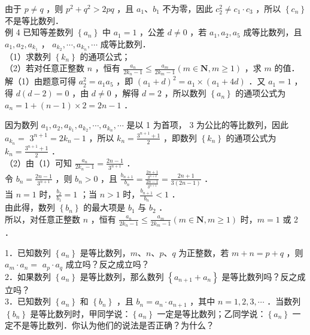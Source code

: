 \documentclass[10pt]{article}
\begin{document}
由于 \(p \neq q\) ，则 \(p^{2}+q^{2}>2 p q\) ，且 \(a_{1} 、 b_{1}\) 不为零，因此 \(c_{2}^{2} \neq c_{1} \cdot c_{3}\) ，所以 \(\left\{c_{n}\right\}\) 不是等比数列．\\
例 4 已知等差数列 \(\left\{a_{n}\right\}\) 中 \(a_{1}=1\) ，公差 \(d \neq 0\) ，若 \(a_{1}, a_{2}, a_{5}\) 成等比数列，且 \(a_{1}, a_{2}, a_{k_{1}}\) ， \(a_{k_{2}}, \cdots, a_{k_{n}}, \cdots\) 成等比数列．\\
（1）求数列 \(\left\{k_{n}\right\}\) 的通项公式；\\
（2）若对任意正整数 \(n\) ，恒有 \(\frac{a_{n}}{2 k_{n}-1} \leqslant \frac{a_{m}}{2 k_{m}-1}(m \in \mathbf{N}, m \geqslant 1)\) ，求 \(m\) 的值．\\
解（1）由题意可得 \(a_{2}^{2}=a_{1} a_{5}\) ，即 \(\left(a_{1}+d\right)^{2}=a_{1} \times\left(a_{1}+4 d\right)\) ．又 \(a_{1}=1\) ，得 \(d(d-2)=0\) ，由 \(d \neq 0\) ，解得 \(d=2\) ，所以数列 \(\left\{a_{n}\right\}\) 的通项公式为 \(a_{n}=1+(n-1) \times 2=2 n-1\) ．

因为数列 \(a_{1}, a_{2}, a_{k_{1}}, a_{k_{2}}, \cdots, a_{k_{n}}, \cdots\) 是以 1 为首项， 3 为公比的等比数列，因此 \(a_{k_{n}}=\) \(3^{n+1}=2 k_{n}-1\) ，所以 \(k_{n}=\frac{3^{n+1}+1}{2}\) ，即数列 \(\left\{k_{n}\right\}\) 的通项公式为 \(k_{n}=\frac{3^{n+1}+1}{2}\) ．\\
（2）由（1）可知 \(\frac{a_{n}}{2 k_{n}-1}=\frac{2 n-1}{3^{n+1}}\) ．\\
令 \(b_{n}=\frac{2 n-1}{3^{n+1}}\) ，则 \(b_{n}>0\) ，且 \(\frac{b_{n+1}}{b_{n}}=\frac{\frac{2 n+1}{3^{n+2}}}{\frac{2 n-1}{3^{n+1}}}=\frac{2 n+1}{3(2 n-1)}\) ．\\
当 \(n=1\) 时，\(\frac{b_{2}}{b_{1}}=1\) ；当 \(n>1\) 时，\(\frac{b_{n+1}}{b_{n}}<1\) ．\\
由此得，数列 \(\left\{b_{n}\right\}\) 的最大项是 \(b_{1}\) 与 \(b_{2}\) ．\\
所以，对任意正整数 \(n\) ，恒有 \(\frac{a_{n}}{2 k_{n}-1} \leqslant \frac{a_{m}}{2 k_{m}-1}(m \in \mathbf{N}, m \geqslant 1)\) 时，\(m=1\) 或 2 ．

1．已知数列 \(\left\{a_{n}\right\}\) 是等比数列，\(m 、 n 、 p 、 q\) 为正整数，若 \(m+n=p+q\) ，则 \(a_{m} \cdot a_{n}=\) \(a_{p} \cdot a_{q}\) 成立吗？反之成立吗？\\
2．如果数列 \(\left\{a_{n}\right\}\) 是等比数列，那么数列 \(\left\{a_{n+1}+a_{n}\right\}\) 是等比数列吗？反之成立吗？\\
3．已知数列 \(\left\{a_{n}\right\}\) 和 \(\left\{b_{n}\right\}\) ，且 \(b_{n}=a_{n} \cdot a_{n+1}\) ，其中 \(n=1,2,3, \cdots\) ．当数列 \(\left\{b_{n}\right\}\) 是等比数列时，甲同学说：\(\left\{a_{n}\right\}\) 一定是等比数列；乙同学说：\(\left\{a_{n}\right\}\) 一定不是等比数列．你认为他们的说法是否正确？为什么？
\end{document}
